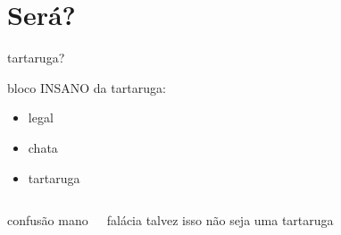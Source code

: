 \documentclass{beamer}
\begin{document}
\section{Será?}
\begin{frame}{tartaruga?}
	\begin{block}{bloco INSANO da tartaruga:}
		\begin{itemize}
			\item legal
			\item chata
			\item tartaruga
		\end{itemize}
	\end{block}
	\begin{columns}
		\column{3cm}
		\begin{alertblock}{confusão}
			mano
		\end{alertblock}
		\column{6cm}
		\begin{exampleblock}{falácia}
		talvez isso não seja uma tartaruga
		\end{exampleblock}
	\end{columns}
\end{frame}
\end{document}
